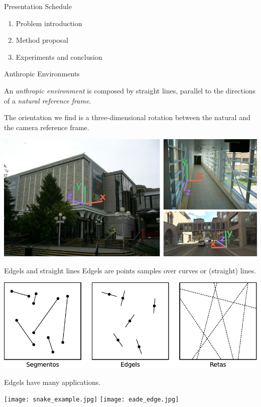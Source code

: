 \begin{frame}{Presentation Schedule}
  \begin{enumerate}
  \item Problem introduction
  \item Method proposal
  \item Experiments and conclusion
  \end{enumerate}
\end{frame}


\begin{frame}{Anthropic Environments}


An {\em anthropic environment} is composed by straight lines, parallel to the directions of a {\em natural reference frame}.
  
The orientation we find is a three-dimensional rotation between the natural and the camera reference frame.

  \hspace{0.0\baselineskip}\centerline{
    \includegraphics[height=9\baselineskip]{antrop.png}
  }
\end{frame}


\begin{frame}{Edgels and straight lines}
  Edgels are points samples over curves or (straight) lines.
  \centerline{
    \includegraphics[height=5\baselineskip]{lineseg.pdf}
  }
  
  Edgels have many applications.
  \centerline{
    \texttt{[image: snake\_example.jpg]}\quad
    \texttt{[image: eade\_edge.jpg]}
  }
\end{frame}


